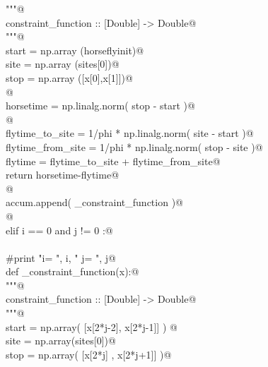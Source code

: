 \documentclass[11.5pt]{report}
\begin{document}
\begin{flushleft}
\begin{list}{}{}
\mbox{}\verb@                        """@\\
\mbox{}\verb@                        constraint_function :: [Double] -> Double@\\
\mbox{}\verb@                        """@\\
\mbox{}\verb@                        start = np.array (horseflyinit)@\\
\mbox{}\verb@                        site  = np.array (sites[0])@\\
\mbox{}\verb@                        stop  = np.array ([x[0],x[1]])@\\
\mbox{}\verb@                        @\\
\mbox{}\verb@                        horsetime = np.linalg.norm( stop - start )@\\
\mbox{}\verb@                        @\\
\mbox{}\verb@                        flytime_to_site   = 1/phi * np.linalg.norm( site - start )@\\
\mbox{}\verb@                        flytime_from_site = 1/phi * np.linalg.norm( stop - site  )@\\
\mbox{}\verb@                        flytime           = flytime_to_site + flytime_from_site@\\
\mbox{}\verb@                        return horsetime-flytime@\\
\mbox{}\verb@                    @\\
\mbox{}\verb@                    accum.append( _constraint_function )@\\
\mbox{}\verb@                    @\\
\mbox{}\verb@              elif  i == 0 and j != 0 :@\\
\mbox{}\verb@@\\
\mbox{}\verb@                    #print "i= ", i, " j= ", j@\\
\mbox{}\verb@                    def _constraint_function(x):@\\
\mbox{}\verb@                          """@\\
\mbox{}\verb@                          constraint_function :: [Double] -> Double@\\
\mbox{}\verb@                          """@\\
\mbox{}\verb@                          start = np.array( [x[2*j-2], x[2*j-1]] ) @\\
\mbox{}\verb@                          site  = np.array(sites[0])@\\
\mbox{}\verb@                          stop  = np.array( [x[2*j]  , x[2*j+1]] )@\\

\end{list}
\end{flushleft}
\end{document}
